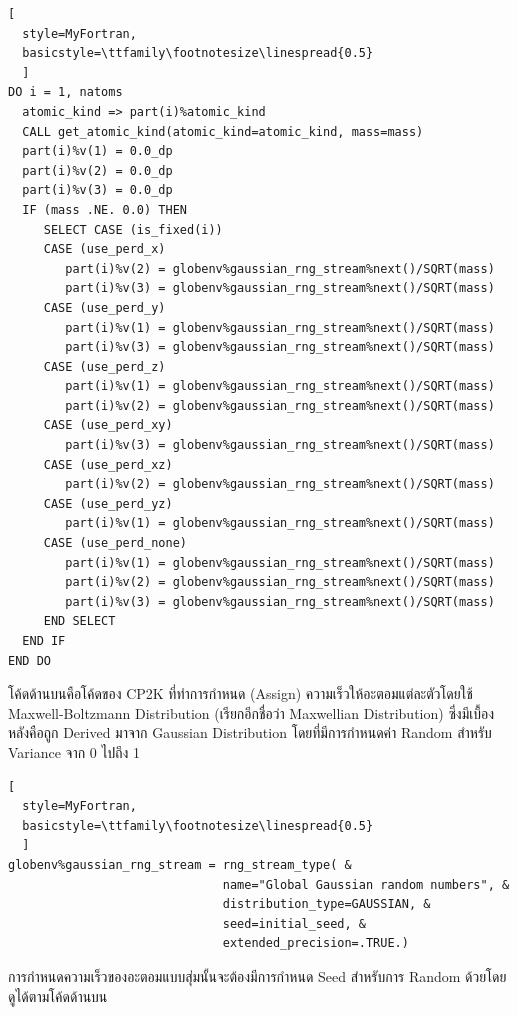 \begin{lstlisting}[
  style=MyFortran,
  basicstyle=\ttfamily\footnotesize\linespread{0.5}
  ]
DO i = 1, natoms
  atomic_kind => part(i)%atomic_kind
  CALL get_atomic_kind(atomic_kind=atomic_kind, mass=mass)
  part(i)%v(1) = 0.0_dp
  part(i)%v(2) = 0.0_dp
  part(i)%v(3) = 0.0_dp
  IF (mass .NE. 0.0) THEN
     SELECT CASE (is_fixed(i))
     CASE (use_perd_x)
        part(i)%v(2) = globenv%gaussian_rng_stream%next()/SQRT(mass)
        part(i)%v(3) = globenv%gaussian_rng_stream%next()/SQRT(mass)
     CASE (use_perd_y)
        part(i)%v(1) = globenv%gaussian_rng_stream%next()/SQRT(mass)
        part(i)%v(3) = globenv%gaussian_rng_stream%next()/SQRT(mass)
     CASE (use_perd_z)
        part(i)%v(1) = globenv%gaussian_rng_stream%next()/SQRT(mass)
        part(i)%v(2) = globenv%gaussian_rng_stream%next()/SQRT(mass)
     CASE (use_perd_xy)
        part(i)%v(3) = globenv%gaussian_rng_stream%next()/SQRT(mass)
     CASE (use_perd_xz)
        part(i)%v(2) = globenv%gaussian_rng_stream%next()/SQRT(mass)
     CASE (use_perd_yz)
        part(i)%v(1) = globenv%gaussian_rng_stream%next()/SQRT(mass)
     CASE (use_perd_none)
        part(i)%v(1) = globenv%gaussian_rng_stream%next()/SQRT(mass)
        part(i)%v(2) = globenv%gaussian_rng_stream%next()/SQRT(mass)
        part(i)%v(3) = globenv%gaussian_rng_stream%next()/SQRT(mass)
     END SELECT
  END IF
END DO
\end{lstlisting}

โค้ดด้านบนคือโค้ดของ CP2K ที่ทำการกำหนด (Assign) ความเร็วให้อะตอมแต่ละตัวโดยใช้ Maxwell-Boltzmann Distribution
(เรียกอีกชื่อว่า Maxwellian Distribution) ซึ่งมีเบื้องหลังคือถูก Derived มาจาก Gaussian Distribution โดยที่มีการกำหนดค่า Random
สำหรับ Variance จาก 0 ไปถึง 1

\begin{lstlisting}[
  style=MyFortran,
  basicstyle=\ttfamily\footnotesize\linespread{0.5}
  ]
globenv%gaussian_rng_stream = rng_stream_type( &
                              name="Global Gaussian random numbers", &
                              distribution_type=GAUSSIAN, &
                              seed=initial_seed, &
                              extended_precision=.TRUE.)
\end{lstlisting}

\noindent การกำหนดความเร็วของอะตอมแบบสุ่มนั้นจะต้องมีการกำหนด Seed สำหรับการ Random ด้วยโดยดูได้ตามโค้ดด้านบน

